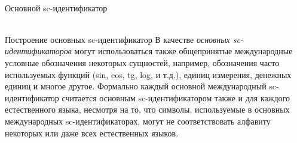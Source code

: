 \begin{frame}{\\Основной sc-идентификатор}
	\topline
	\justifying
	\begin{SCn}
		\begin{scnindent}
		\end{scnindent}
	\end{SCn}
	
\end{frame}

\begin{frame}{\\Построение основных sc-идентификатор}
	\topline
	\justifying
	В качестве \textit{основных sc-идентификаторов} могут использоваться также общепринятые международные условные обозначения некоторых сущностей, например, обозначения часто используемых функций (sin, cos, tg, log, и т.д.), единиц измерения, денежных единиц и многое другое. Формально каждый основной международный sc-идентификатор считается основным sc-идентификатором также и для каждого естественного языка, несмотря на то, что символы, используемые в основных международных sc-идентификаторах, могут не соответствовать алфавиту некоторых или даже всех естественных языков.
\end{frame}

